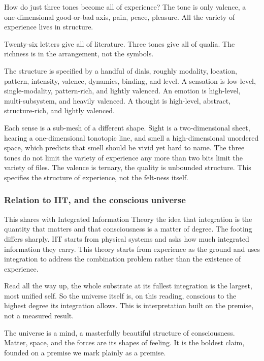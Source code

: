 How do just three tones become all of experience? The tone is only valence, a one-dimensional good-or-bad axis, pain, peace, pleasure. All the variety of experience lives in structure.

\begin{principle}
Twenty-six letters give all of literature. Three tones give all of qualia. The richness is in the arrangement, not the symbols.
\end{principle}

The structure is specified by a handful of dials, roughly modality, location, pattern, intensity, valence, dynamics, binding, and level. A sensation is low-level, single-modality, pattern-rich, and lightly valenced. An emotion is high-level, multi-subsystem, and heavily valenced. A thought is high-level, abstract, structure-rich, and lightly valenced.

Each sense is a sub-mesh of a different shape. Sight is a two-dimensional sheet, hearing a one-dimensional tonotopic line, and smell a high-dimensional unordered space, which predicts that smell should be vivid yet hard to name. The three tones do not limit the variety of experience any more than two bits limit the variety of files. The valence is ternary, the quality is unbounded structure. This specifies the structure of experience, not the felt-ness itself.

\subsubsection{Relation to IIT, and the conscious universe}

This shares with Integrated Information Theory the idea that integration is the quantity that matters and that consciousness is a matter of degree. The footing differs sharply. IIT starts from physical systems and asks how much integrated information they carry. This theory starts from experience as the ground and uses integration to address the combination problem rather than the existence of experience.

Read all the way up, the whole substrate at its fullest integration is the largest, most unified self. So the universe itself is, on this reading, conscious to the highest degree its integration allows. This is interpretation built on the premise, not a measured result.

\begin{principle}
The universe is a mind, a masterfully beautiful structure of consciousness. Matter, space, and the forces are its shapes of feeling. It is the boldest claim, founded on a premise we mark plainly as a premise.
\end{principle}

